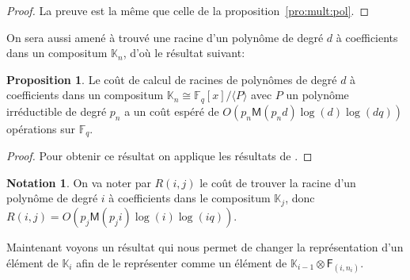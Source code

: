\documentclass[10pt,a4paper]{book}
\theoremstyle{plain}
\theoremstyle{definition}
\theoremstyle{definition}
\theoremstyle{definition}
\newtheorem{prop}[thm]{Proposition}
\theoremstyle{definition}
\theoremstyle{remark}
\theoremstyle{remark}
\theoremstyle{definition}
\newtheorem{nota}[thm]{Notation}
\begin{document}
 \begin{proof}
 La preuve est la même que celle de la proposition~\ref{pro:mult:pol}.
 \end{proof}
 
 On sera aussi amené à trouvé une racine d'un polynôme de degré $d$ à 
 coefficients dans un compositum $\mathbb{K}_n$, d'où le résultat suivant:
 
\begin{prop}
\label{pro:rac:com}
 Le coût de calcul de racines de polynômes de degré $d$ à coefficients dans un 
 compositum $\mathbb{K}_{n} \cong \mathbb{F}_q[x]/ \langle P \rangle$
 avec $P$ un polynôme irréductible de degré $p_n$ a un coût espéré de 
 $O(p_n \mathsf{M}(p_nd)\log(d)\log(dq))$ opérations sur $\mathbb{F}_q$.
\end{prop}
 
\begin{proof}
Pour obtenir ce résultat on applique les résultats de \cite[Chapter 14.5]{vzGJG03}.
\end{proof}

\begin{nota}
On va noter par $R(i,j)$ le coût de trouver la racine d'un polynôme de degré 
$i$ à coefficients dans le compositum $\mathbb{K}_j$, donc 
$R(i,j)=O(p_j \mathsf{M}(p_ji)\log(i)\log(iq))$.
\end{nota}

Maintenant voyons un résultat qui nous permet de changer la 
représentation d'un élément de $\mathbb{K}_i$ afin de le représenter comme un 
élément de $\mathbb{K}_{i-1} \otimes \mathsf{F}_{(i,n_i)}$. 
\end{document}
